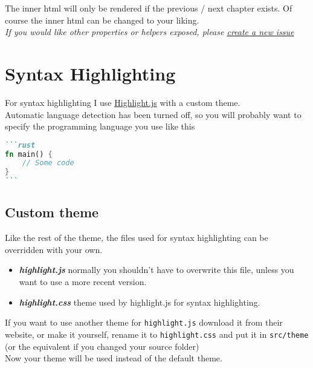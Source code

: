 \documentclass{article}
\begin{document}
The inner html will only be rendered if the previous / next chapter exists.
Of course the inner html can be changed to your liking.\\

\emph{If you would like other properties or helpers exposed, please \href{https://github.com/rust-lang-nursery/mdBook/issues}{create a new
issue}}\\

\section{Syntax Highlighting}
\label{Syntax Highlighting}
\label{syntax-highlighting}

For syntax highlighting I use \href{https://highlightjs.org}{Highlight.js} with a
custom theme.\\

Automatic language detection has been turned off, so you will probably want to
specify the programming language you use like this\\
\begin{lstlisting}[language=markdown]```rust
fn main() {
    // Some code
}
```\end{lstlisting}

\subsection{Custom theme}
\label{Custom theme}
\label{custom-theme}

Like the rest of the theme, the files used for syntax highlighting can be
overridden with your own.\\
\begin{itemize}
\item \emph{\textbf{highlight.js}} normally you shouldn't have to overwrite this file, unless
you want to use a more recent version.
\item \emph{\textbf{highlight.css}} theme used by highlight.js for syntax highlighting.
\end{itemize}

If you want to use another theme for \lstinline|highlight.js| download it from their
website, or make it yourself, rename it to \lstinline|highlight.css| and put it in
\lstinline|src/theme| (or the equivalent if you changed your source folder)\\

Now your theme will be used instead of the default theme.\\
\end{document}
